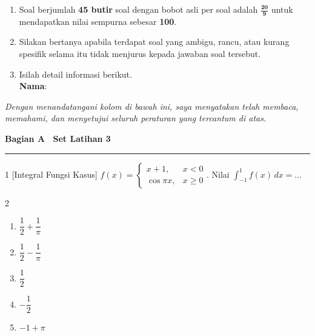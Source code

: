 \documentclass[11pt]{article}
\newenvironment{pilB}{%
  \par\smallskip\begin{multicols}{2}
  \begin{enumerate}[label=(\alph*),leftmargin=*,itemsep=1pt,topsep=3pt]}%
  {\end{enumerate}\end{multicols}}
\begin{document}
\begin{enumerate}[leftmargin=*,itemsep=4pt,topsep=4pt]
  \item Soal berjumlah \textbf{45 butir} soal dengan bobot asli per soal adalah
        $\mathbf{\tfrac{20}{9}}$ untuk mendapatkan nilai sempurna sebesar \textbf{100}.

  \item Silakan bertanya apabila terdapat soal yang ambigu, rancu, atau kurang
        spesifik selama itu tidak menjurus kepada jawaban soal tersebut.

  \item Isilah detail informasi berikut.\\[0.3em]
        \textbf{Nama}\hspace{0.45cm}:\enspace\underline{\hspace{8cm}}
\end{enumerate}

\vspace{0.6cm}
\noindent\textit{Dengan menandatangani kolom di bawah ini, saya menyatakan telah membaca,
memahami, dan menyetujui seluruh peraturan yang tercantum di atas.}

\vspace{0.6cm}
\noindent{}

\clearpage


{\noindent\large\bfseries Bagian A \textendash\ Set Latihan 3\par}
\smallskip\hrule\medskip

\begin{soal}{1 \normalfont\small[Integral Fungsi Kasus]}
$f(x)=\begin{cases}x+1,&x<0\\\cos\pi x,&x\ge0\end{cases}$.
Nilai $\displaystyle\int_{-1}^1 f(x)\,dx=\ldots$
\begin{pilB}
  \item $\dfrac12+\dfrac1\pi$ \item $\dfrac12-\dfrac1\pi$ \item $\dfrac12$ \item $-\dfrac12$ \item $-1+\pi$
\end{pilB}
\end{soal}
\end{document}
